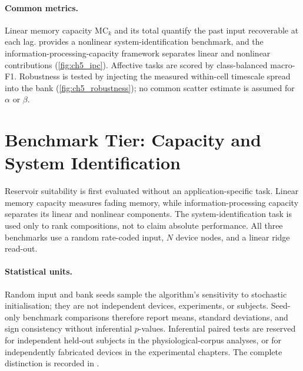 \documentclass[12pt, twoside]{report}
\begin{document}
\paragraph{Common metrics.} Linear memory capacity $\mathrm{MC}_k$ and its total \cite{Jaeger2002STM} quantify the past input recoverable at each lag. \NARMA{} \cite{AtiyaParlos2000} provides a nonlinear system-identification benchmark, and the information-processing-capacity framework \cite{Dambre2012} separates linear and nonlinear contributions (\cref{fig:ch5_ipc}). Affective tasks are scored by class-balanced macro-F1. Robustness is tested by injecting the measured within-cell timescale spread into the bank (\cref{fig:ch5_robustness}); no common scatter estimate is assumed for $\alpha$ or $\beta$.

\section{Benchmark Tier: Capacity and System Identification}\label{sec:ch5_benchmarks}

Reservoir suitability is first evaluated without an application-specific task. Linear memory capacity measures fading memory, while information-processing capacity separates its linear and nonlinear components. The \NARMA{} system-identification task is used only to rank compositions, not to claim absolute performance. All three benchmarks use a random rate-coded input, $N$ device nodes, and a linear ridge read-out.

\paragraph{Statistical units.} Random input and bank seeds sample the algorithm's sensitivity to stochastic initialisation; they are not independent devices, experiments, or subjects. Seed-only benchmark comparisons therefore report means, standard deviations, and sign consistency without inferential $p$-values. Inferential paired tests are reserved for independent held-out subjects in the physiological-corpus analyses, or for independently fabricated devices in the experimental chapters. The complete distinction is recorded in .
\end{document}
